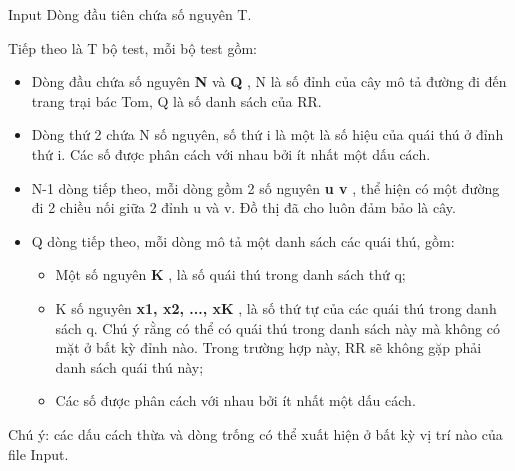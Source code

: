 Input
Dòng đầu tiên chứa số nguyên T.

Tiếp theo là T bộ test, mỗi bộ test gồm:
\begin{itemize}
	\item Dòng đầu chứa số nguyên \textbf{ N } và \textbf{ Q } , N là số đỉnh của cây mô tả đường đi đến trang trại bác Tom, Q là số danh sách của RR.
	\item Dòng thứ 2 chứa N số nguyên, số thứ i là một là số hiệu của quái thú ở đỉnh thứ i. Các số được phân cách với nhau bởi ít nhất một dấu cách.
	\item N-1 dòng tiếp theo, mỗi dòng gồm 2 số nguyên \textbf{ u v } , thể hiện có một đường đi 2 chiều nối giữa 2 đỉnh u và v. Đồ thị đã cho luôn đảm bảo là cây.
	\item Q dòng tiếp theo, mỗi dòng mô tả một danh sách các quái thú, gồm:
\begin{itemize}
	\item Một số nguyên \textbf{ K } , là số quái thú trong danh sách thứ q;
	\item K số nguyên \textbf{ x1, x2, ..., xK } , là số thứ tự của các quái thú trong danh sách q. Chú ý rằng có thể có quái thú trong danh sách này mà không có mặt ở bất kỳ đỉnh nào. Trong trường hợp này, RR sẽ không gặp phải danh sách quái thú này;
\end{itemize}
\begin{itemize}
	\item Các số được phân cách với nhau bởi ít nhất một dấu cách.
\end{itemize}
\end{itemize}

Chú ý: các dấu cách thừa và dòng trống có thể xuất hiện ở bất kỳ vị trí nào của file Input.